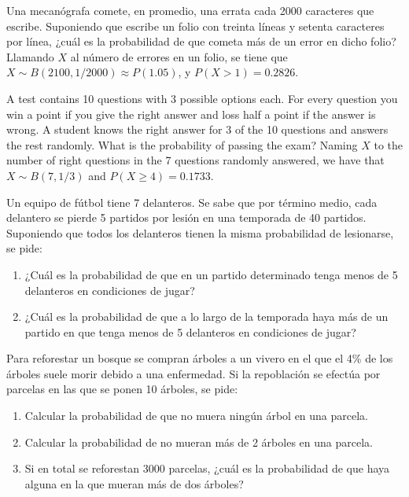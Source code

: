 {Una mecanógrafa comete, en promedio, una errata cada 2000 caracteres que escribe.
Suponiendo que escribe un folio con treinta líneas y setenta caracteres por línea, ¿cuál es la probabilidad de que
cometa más de un error en dicho folio?}
{Llamando $X$ al número de errores en un folio, se tiene que $X\sim B(2100,1/2000)\approx P(1.05)$, y $P(X>1)=0.2826$.
}
{}


{A test contains 10 questions with 3 possible options each. 
For every question you win a point if you give the right answer and loss half a point if the answer is wrong. 
A student knows the right answer for 3 of the 10 questions and answers the rest randomly. 
What is the probability of passing the exam?}
{Naming $X$ to the number of right questions in the 7 questions randomly answered, we have that $X\sim B(7,1/3)$ and $P(X\geq 4)=0.1733$.}
{}


{Un equipo de fútbol tiene 7 delanteros. Se sabe que por término medio, cada delantero se pierde 5 partidos por lesión en una temporada de 40 partidos. Suponiendo que todos los delanteros tienen la misma probabilidad de lesionarse, se pide:
\begin{enumerate}
\item  ¿Cuál es la probabilidad de que en un partido determinado tenga menos de 5 delanteros en condiciones de jugar?
\item  ¿Cuál es la probabilidad de que a lo largo de la temporada haya más de un partido en que tenga menos de 5  delanteros en condiciones de jugar?
\end{enumerate}
}
{}
{}


{Para reforestar un bosque se compran árboles a un vivero en el que el 4\% de los árboles suele morir debido a una enfermedad. Si la repoblación se efectúa por parcelas en las que se ponen 10 árboles, se pide:
\begin{enumerate}
\item Calcular la probabilidad de que no muera ningún árbol en una parcela.
\item Calcular la probabilidad de no mueran más de 2 árboles en una parcela.
\item Si en total se reforestan 3000 parcelas, ¿cuál es la probabilidad de que haya alguna en la que mueran más de dos árboles?
\end{enumerate}
}
{}
{}


